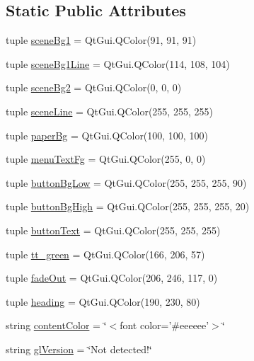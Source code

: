 \subsection*{Static Public Attributes}
\begin{DoxyCompactItemize}
\item 
tuple \hyperlink{classcolors_1_1Colors_a07819baa8c69647aaa2da48054611c1b}{scene\+Bg1} = Qt\+Gui.\+Q\+Color(91, 91, 91)
\item 
tuple \hyperlink{classcolors_1_1Colors_aa233072a8580962ccd11d4c5879ce477}{scene\+Bg1\+Line} = Qt\+Gui.\+Q\+Color(114, 108, 104)
\item 
tuple \hyperlink{classcolors_1_1Colors_af11d9ba2e00592e5d6542c1a6c0db312}{scene\+Bg2} = Qt\+Gui.\+Q\+Color(0, 0, 0)
\item 
tuple \hyperlink{classcolors_1_1Colors_a1a8a51f3d21fdaf1fbdeaee0eceee099}{scene\+Line} = Qt\+Gui.\+Q\+Color(255, 255, 255)
\item 
tuple \hyperlink{classcolors_1_1Colors_aef5420b74f0f68005bcf2a88d3f5200c}{paper\+Bg} = Qt\+Gui.\+Q\+Color(100, 100, 100)
\item 
tuple \hyperlink{classcolors_1_1Colors_aa540a94e2a571575f05f2d2aa0fbd9f2}{menu\+Text\+Fg} = Qt\+Gui.\+Q\+Color(255, 0, 0)
\item 
tuple \hyperlink{classcolors_1_1Colors_ae907e6fc79d56dc05a8ab6bae4733883}{button\+Bg\+Low} = Qt\+Gui.\+Q\+Color(255, 255, 255, 90)
\item 
tuple \hyperlink{classcolors_1_1Colors_a8d89d5462b950e97281ce67ad71cba16}{button\+Bg\+High} = Qt\+Gui.\+Q\+Color(255, 255, 255, 20)
\item 
tuple \hyperlink{classcolors_1_1Colors_aee3b8e129ec929e5a544f8dff5ae46d4}{button\+Text} = Qt\+Gui.\+Q\+Color(255, 255, 255)
\item 
tuple \hyperlink{classcolors_1_1Colors_a3dce7d4d8c4c605c9a9dc960b1e6c619}{tt\+\_\+green} = Qt\+Gui.\+Q\+Color(166, 206, 57)
\item 
tuple \hyperlink{classcolors_1_1Colors_a39cdbb57c7def8b97bcfdcb2d2f4f664}{fade\+Out} = Qt\+Gui.\+Q\+Color(206, 246, 117, 0)
\item 
tuple \hyperlink{classcolors_1_1Colors_ad50ebf76e91ac21dee363a113a8765e3}{heading} = Qt\+Gui.\+Q\+Color(190, 230, 80)
\item 
string \hyperlink{classcolors_1_1Colors_ad8853f34d096c971551570dcff0ae846}{content\+Color} = \char`\"{}$<$font color='\#eeeeee'$>$\char`\"{}
\item 
string \hyperlink{classcolors_1_1Colors_abc0a79de7eb4e2423c5faa6fbd602888}{gl\+Version} = \char`\"{}Not detected!\char`\"{}

\end{DoxyCompactItemize}
